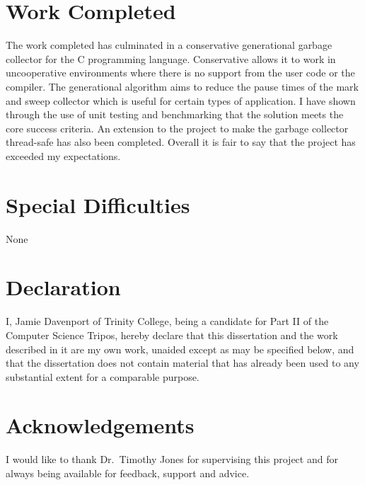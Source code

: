 \documentclass[12pt,a4paper,twoside,openright]{report}
\begin{document}
\section*{Work Completed}

The work completed has culminated in a conservative generational garbage collector for the C programming language. Conservative allows it to work in uncooperative environments where there is no support from the user code or the compiler. The generational algorithm aims to reduce the pause times of the mark and sweep collector which is useful for certain types of application. I have shown through the use of unit testing and benchmarking that the solution meets the core success criteria. An extension to the project to make the garbage collector thread-safe has also been completed. Overall it is fair to say that the project has exceeded my expectations.

\section*{Special Difficulties}

None
 
\newpage
\section*{Declaration}

I, Jamie Davenport of Trinity College, being a candidate for Part II of the Computer
Science Tripos, hereby declare
that this dissertation and the work described in it are my own work,
unaided except as may be specified below, and that the dissertation
does not contain material that has already been used to any substantial
extent for a comparable purpose.

\bigskip
{}

\medskip
{}

\tableofcontents

\listoffigures

\newpage
\section*{Acknowledgements} 

I would like to thank Dr.~Timothy Jones for supervising this project and for always being available for feedback, support and advice.

\end{document}
